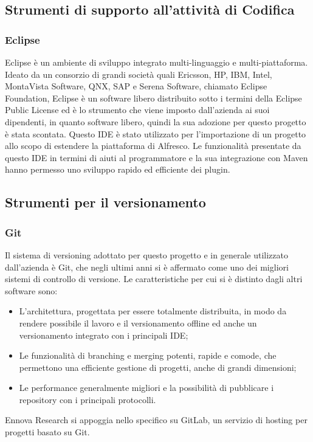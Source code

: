 \subsection{Strumenti di supporto all’attività di Codifica}
\subsubsection{Eclipse}
Eclipse è un ambiente di sviluppo integrato multi-linguaggio e multi-piattaforma. Ideato da un consorzio di grandi società quali Ericsson, HP, IBM, Intel, MontaVista Software, QNX, SAP e Serena Software, chiamato Eclipse Foundation,
Eclipse è un software libero distribuito sotto i termini della Eclipse Public License ed è lo strumento che viene imposto dall'azienda ai suoi dipendenti, in quanto software libero, quindi la sua adozione per questo progetto è stata scontata.
Questo IDE è stato utilizzato per l’importazione
di un progetto allo scopo di estendere la piattaforma di Alfresco. Le funzionalità
presentate da questo IDE in termini di aiuti al programmatore e la sua integrazione con Maven hanno permesso uno sviluppo rapido ed efficiente dei plugin.
\subsection{Strumenti per il versionamento}
\subsubsection{Git}
Il sistema di versioning adottato per questo progetto e in generale utilizzato dall'azienda è Git, che negli ultimi anni si è affermato come uno
dei migliori sistemi di controllo di versione.
Le caratteristiche per cui si è distinto dagli altri software sono:
\begin{itemize}
\item L’architettura, progettata per essere totalmente distribuita, in modo da
rendere possibile il lavoro e il versionamento offline ed anche un versionamento integrato con i principali IDE;
\item Le funzionalità di branching e merging potenti, rapide e comode, che permettono una efficiente gestione di progetti, anche di grandi dimensioni;
\item Le performance generalmente migliori e la possibilità di pubblicare i repository con i principali protocolli.
\end{itemize}
Ennova Research si appoggia nello specifico su GitLab, un servizio di hosting per progetti basato
su Git.
